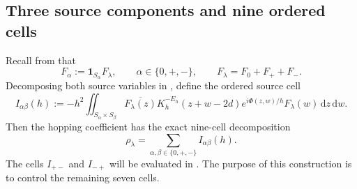 \documentclass[11pt]{article}
\newcommand{\dd}{\,\mathrm d}
\begin{document}
\subsection{Three source components and nine ordered cells}
\label{ssec:global}
Recall from  that
\[
 F_\alpha:=\mathbf 1_{S_\alpha}F_\lambda,
 \qquad \alpha\in\{0,+,-\},
 \qquad F_\lambda=F_0+F_++F_-.
\]
Decomposing both source variables in , define the ordered source cell
\begin{equation}\label{eq:cell-ab}
 I_{\alpha\beta}(h)
 :=-h^2\iint_{S_\alpha\times S_\beta}
 \overline{F_\lambda(z)}K_h^{-E_h}(z+w-2d)
 e^{i\Phi(z,w)/h}F_\lambda(w)\dd z\dd w.
\end{equation}
Then the hopping coefficient has the exact
nine-cell decomposition
\begin{equation}\label{eq:nine-cell-decomp}
 \rho_\lambda=\sum_{\alpha,\beta\in\{0,+,-\}}I_{\alpha\beta}(h).
\end{equation}
The cells $I_{+-}$ and $I_{-+}$ will be evaluated in .  The purpose of this construction is to control the
remaining seven cells.
\end{document}
